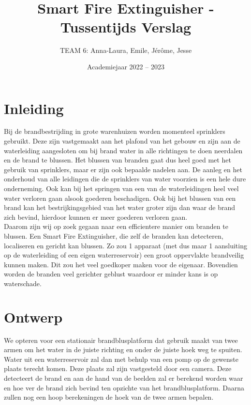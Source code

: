\documentclass[kulak]{kulakarticle} %
\title{Smart Fire Extinguisher - Tussentijds Verslag}
\author{TEAM 6: Anna-Laura, Emile, Jérôme, Jesse}
\date{Academiejaar 2022 -- 2023}
\begin{document}
\maketitle

\section*{Inleiding}

Bij de brandbestrijding in grote warenhuizen worden momenteel sprinklers gebruikt. Deze zijn vastgemaakt aan het plafond van het gebouw en zijn aan de waterleiding aangesloten om bij brand water in alle richtingen te doen neerdalen en de brand te blussen. Het blussen van branden gaat dus heel goed met het gebruik van sprinklers, maar er zijn ook bepaalde nadelen aan. De aanleg en het onderhoud van alle leidingen die de sprinklers van water voorzien is een hele dure onderneming. Ook kan bij het springen van een van de waterleidingen heel veel water verloren gaan alsook goederen beschadigen. Ook bij het blussen van een brand kan het bestrijkingsgebied van het water groter zijn dan waar de brand zich bevind, hierdoor kunnen er meer goederen verloren gaan. \\

Daarom zijn wij op zoek gegaan naar een efficientere manier om branden te blussen. Een Smart Fire Extinguisher, die zelf de branden kan detecteren, localiseren en gericht kan blussen. Zo zou 1 apparaat (met dus maar 1 aansluiting op de waterleiding of een eigen waterreservoir) een groot oppervlakte brandveilig kunnen maken. Dit zou het veel goedkoper maken voor de eigenaar. Bovendien worden de branden veel gerichter geblust waardoor er minder kans is op waterschade.

\section{Ontwerp}

We opteren voor een stationair brandblusplatform dat gebruik maakt van twee armen om het water in de juiste richting en onder de juiste hoek weg te spuiten. Water uit een waterreservoir zal dan met behulp van een pomp op de gewenste plaats terecht komen. Deze plaats zal zijn vastgesteld door een camera. Deze detecteert de brand en aan de hand van de beelden zal er berekend worden waar en hoe ver de brand zich bevind ten opzichte van het brandblusplatform. Daarna zullen nog een hoop berekeningen de hoek van de twee armen bepalen. \\
\end{document}
